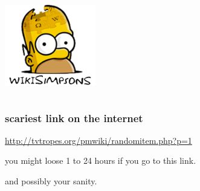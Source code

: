 \documentclass{beamer}
\begin{document}
\begin{frame}
\begin{columns}
\begin{column}{0.5\textwidth}
      \includegraphics[width = \textwidth, height = 0.4\textheight, keepaspectratio = true]{figure/simpsons_2}
    \end{column}
  \end{columns}
\end{frame}

\begin{frame}
  \frametitle{scariest link on the internet}

  \url{http://tvtropes.org/pmwiki/randomitem.php?p=1}

  you might loose 1 to 24 hours if you go to this link. 
  
  and possibly your sanity.
\end{frame}
\end{document}
